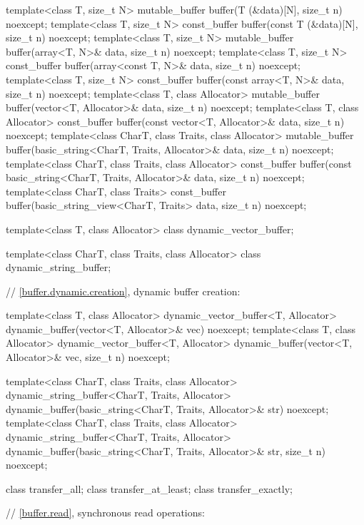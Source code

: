 \begin{codeblock}
{{{{  template<class T, size_t N>
    mutable_buffer buffer(T (&data)[N], size_t n) noexcept;
  template<class T, size_t N>
    const_buffer buffer(const T (&data)[N], size_t n) noexcept;
  template<class T, size_t N>
    mutable_buffer buffer(array<T, N>& data, size_t n) noexcept;
  template<class T, size_t N>
    const_buffer buffer(array<const T, N>& data, size_t n) noexcept;
  template<class T, size_t N>
    const_buffer buffer(const array<T, N>& data, size_t n) noexcept;
  template<class T, class Allocator>
    mutable_buffer buffer(vector<T, Allocator>& data, size_t n) noexcept;
  template<class T, class Allocator>
    const_buffer buffer(const vector<T, Allocator>& data, size_t n) noexcept;
  template<class CharT, class Traits, class Allocator>
    mutable_buffer buffer(basic_string<CharT, Traits, Allocator>& data,
                          size_t n) noexcept;
  template<class CharT, class Traits, class Allocator>
    const_buffer buffer(const basic_string<CharT, Traits, Allocator>& data,
                        size_t n) noexcept;
  template<class CharT, class Traits>
    const_buffer buffer(basic_string_view<CharT, Traits> data,
                        size_t n) noexcept;

  template<class T, class Allocator>
    class dynamic_vector_buffer;

  template<class CharT, class Traits, class Allocator>
    class dynamic_string_buffer;

  // \ref{buffer.dynamic.creation}, dynamic buffer creation:

  template<class T, class Allocator>
    dynamic_vector_buffer<T, Allocator>
    dynamic_buffer(vector<T, Allocator>& vec) noexcept;
  template<class T, class Allocator>
    dynamic_vector_buffer<T, Allocator>
    dynamic_buffer(vector<T, Allocator>& vec, size_t n) noexcept;

  template<class CharT, class Traits, class Allocator>
    dynamic_string_buffer<CharT, Traits, Allocator>
    dynamic_buffer(basic_string<CharT, Traits, Allocator>& str) noexcept;
  template<class CharT, class Traits, class Allocator>
    dynamic_string_buffer<CharT, Traits, Allocator>
    dynamic_buffer(basic_string<CharT, Traits, Allocator>& str, size_t n) noexcept;

  class transfer_all;
  class transfer_at_least;
  class transfer_exactly;

  // \ref{buffer.read}, synchronous read operations:

}}}}
\end{codeblock}
